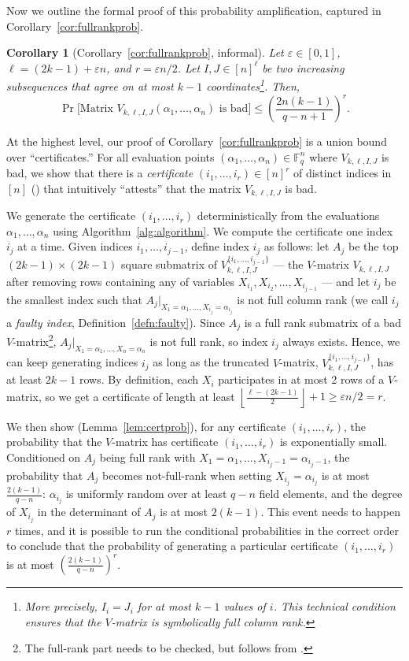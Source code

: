 \documentclass[11pt]{article}
\theoremstyle{plain}
\newtheorem*{cor*}{Corollary}
\theoremstyle{definition}
\theoremstyle{remark}
\newcommand{\floor}[1]{\left\lfloor #1 \right\rfloor}
\begin{document}
Now we outline the formal proof of this probability amplification, captured in Corollary~\ref{cor:fullrankprob}.
\begin{cor*}[Corollary~\ref{cor:fullrankprob}, informal]
Let $\varepsilon\in[0,1]$, $\ell=(2k-1)+\varepsilon n$, and $r = \varepsilon n/2$. Let $I,J\in[n]^{\ell}$ be two increasing subsequences that agree on at most $k-1$ coordinates\footnote{More precisely, $I_i=J_i$ for at most $k-1$ values of $i$. This technical condition ensures that the $V$-matrix is symbolically full column rank.}. Then,
\[
\Pr\bigg[\text{Matrix $V_{k,\ell,I,J}(\alpha_1,\dots,\alpha_n)$ is bad}\bigg]\leq 
\left(\frac{2n(k-1)}{q-n+1}\right)^r.
\]
\end{cor*}

At the highest level, our proof of Corollary~\ref{cor:fullrankprob}  is a union bound over ``certificates.''
For all evaluation points $(\alpha_1,\dots,\alpha_n) \in \mathbb{F}_q^n$ where $V_{k,\ell,I,J}$ is bad, we show that there is a \emph{certificate} $(i_1,\dots,i_r) \in [n]^r$ of distinct indices in $[n]$ () that intuitively ``attests'' that the matrix $V_{k,\ell,I,J}$ is bad.

We generate the certificate $(i_1,\dots,i_r)$ deterministically from the evaluations $\alpha_1,\dots,\alpha_n$ using Algorithm~\ref{alg:algorithm}.
We compute the certificate one index $i_j$ at a time.
Given indices $i_1,\dots,i_{j-1}$, define index $i_j$ as follows: let $A_j$ be the top $(2k-1)\times (2k-1)$ square submatrix of $V_{k,\ell,I,J}^{\{i_1,\dots,i_{j-1}\}}$ --- the $V$-matrix $V_{k,\ell,I,J}$ after removing rows containing any of variables $X_{i_1},X_{i_2},\dots,X_{i_{j-1}}$ --- and let $i_j$ be the smallest index such that $A_j|_{X_1=\alpha_1,\dots,X_{i_j}=\alpha_{i_j}}$ is not full column rank (we call $i_j$ a \emph{faulty index}, Definition~\ref{defn:faulty}).
Since $A_j$ is a full rank submatrix of a bad $V$-matrix\footnote{The full-rank part needs to be checked, but follows from \cite{con2023reed}.}, $A_j|_{X_1=\alpha_1,\dots,X_n=\alpha_n}$ is not full rank, so index $i_j$ always exists. 
Hence, we can keep generating indices $i_j$ as long as the truncated $V$-matrix, $V_{k,\ell,I,J}^{\{i_1,\dots,i_{j-1}\}}$, has at least $2k-1$ rows.
By definition, each $X_i$ participates in at most 2 rows of a $V$-matrix, so we get a certificate of length at least $\floor{\frac{\ell-(2k-1)}{2}}+1 \ge \varepsilon n / 2 = r$.

We then show (Lemma~\ref{lem:certprob}), for any certificate $(i_1,\dots,i_r)$, the probability that the $V$-matrix has certificate $(i_1,\dots,i_r)$ is exponentially small.
Conditioned on $A_j$ being full rank with $X_1=\alpha_1,\dots,X_{i_j-1}=\alpha_{i_j-1}$, the probability that $A_j$ becomes not-full-rank when setting $X_{i_j}=\alpha_{i_j}$ is at most $\frac{2(k-1)}{q-n}$: $\alpha_{i_j}$ is uniformly random over at least $q-n$ field elements, and the degree of $X_{i_j}$ in the determinant of $A_j$ is at most $2(k-1)$.
This event needs to happen $r$ times, and it is possible to run the conditional probabilities in the correct order to conclude that the probability of generating a particular certificate $(i_1,\dots,i_r)$ is at most $\left(\frac{2(k-1)}{q-n}\right)^r$.
\end{document}
